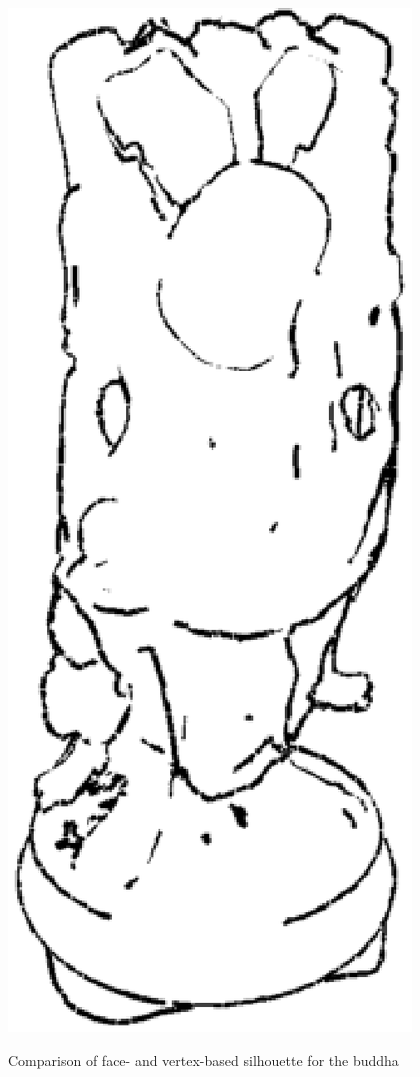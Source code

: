 \documentclass[a4paper,10pt,notitlepage]{scrreprt}
\begin{document}
\begin{figure}
{    \includegraphics[scale=0.35]{img-2-2/buddha-vertex.eps}}
 \caption{Comparison of face- and vertex-based silhouette for the buddha}
 \label{fig:silhouette-buddha}
\end{figure}
\end{document}
